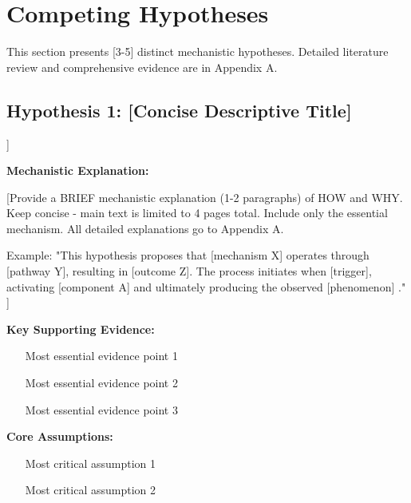 \documentclass[11pt,letterpaper]{article}
\begin{document}
\section{Competing Hypotheses}

This section presents [3-5] distinct mechanistic hypotheses. Detailed literature review and comprehensive evidence are in Appendix A.

\subsection*{Hypothesis 1: [Concise Descriptive Title]}

\begin{hypothesisbox1}[Hypothesis 1: [Title]]

\textbf{Mechanistic Explanation:}

[Provide a BRIEF mechanistic explanation (1-2 paragraphs) of HOW and WHY. Keep concise - main text is limited to 4 pages total. Include only the essential mechanism. All detailed explanations go to Appendix A.

Example: "This hypothesis proposes that [mechanism X] operates through [pathway Y], resulting in [outcome Z]. The process initiates when [trigger], activating [component A] and ultimately producing the observed [phenomenon] \citep{key-ref}."
]

\vspace{0.2cm}

\textbf{Key Supporting Evidence:}
\begin{itemize}
  \item [Most essential evidence point 1 \citep{author2023}]
  \item [Most essential evidence point 2 \citep{author2022}]
  \item [Most essential evidence point 3 \citep{author2021}]
\end{itemize}

\vspace{0.2cm}

\textbf{Core Assumptions:}
\begin{enumerate}
  \item [Most critical assumption 1]
  \item [Most critical assumption 2]
\end{enumerate}

\end{hypothesisbox1}

\vspace{0.3cm}
\end{document}

